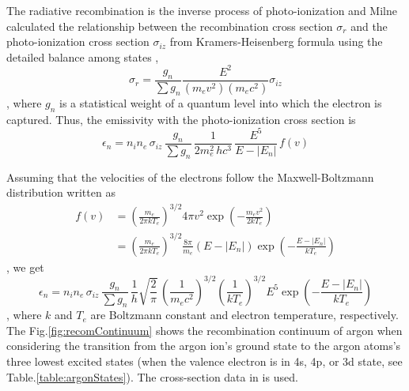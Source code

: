 The radiative recombination is the inverse process of photo-ionization and Milne calculated the relationship between the recombination cross section $\sigma_{r}$ and the photo-ionization cross section $\sigma_{iz}$ from Kramers-Heisenberg formula using the detailed balance among states \cite{seaton1959radiative, karzas1961electron, nahar1997electron},
\begin{equation}
\sigma_{r}=\frac{g_{n}}{\sum g_{n}}\frac{E^{2}}{(m_{e}v^{2})(m_{e}c^{2})}\sigma_{iz}
\end{equation}
, where $g_{n}$ is a statistical weight of a quantum level into which the electron is captured. Thus, the emissivity with the photo-ionization cross section is 
\begin{equation}
\epsilon_{n}=n_{i}n_{e}\,\sigma_{iz}\,\frac{g_{n}}{\sum g_{n}}\,\frac{1}{2m_{e}^{2}\,hc^{3}}\,\frac{E^{5}}{E-\left|E_{n}\right|}\,f(v)
\end{equation}

Assuming that the velocities of the electrons follow the Maxwell-Boltzmann distribution written as
\begin{equation}
\begin{aligned}
f(v) &= \left(\frac{m_{e}}{2\pi kT_{e}}\right)^{3/2}4\pi v^{2}\exp\left(-\frac{m_{e}v^{2}}{2kT_{e}}\right)\\
 &= \left(\frac{m_{e}}{2\pi kT_{e}}\right)^{3/2}\frac{8\pi}{m_{e}}\left(E-\left|E_{n}\right|\right)\exp\left(-\frac{E-\left|E_{n}\right|}{kT_{e}}\right)
\end{aligned}
\end{equation}
, we get
\begin{equation}
\epsilon_{n}=n_{i}n_{e}\,\sigma_{iz}\,\frac{g_{n}}{\sum g_{n}}\,\frac{1}{h}\sqrt{\frac{2}{\pi}}\,\left(\frac{1}{m_{e}c^{2}}\right)^{3/2}\left(\frac{1}{kT_{e}}\right)^{3/2}E^{5}\exp\left(-\frac{E-\left|E_{n}\right|}{kT_{e}}\right)\label{eq:em_int}
\end{equation}
, where $k$ and $T_{e}$ are Boltzmann constant and electron temperature, respectively. The Fig.\ref{fig:recomContinuum} shows the recombination continuum of argon when considering the transition from the argon ion's ground state to the argon atoms's three lowest excited states (when the valence electron is in 4s, 4p, or 3d state, see Table.\ref{table:argonStates}). The cross-section data in \cite{duzy1980photoionization} is used.

